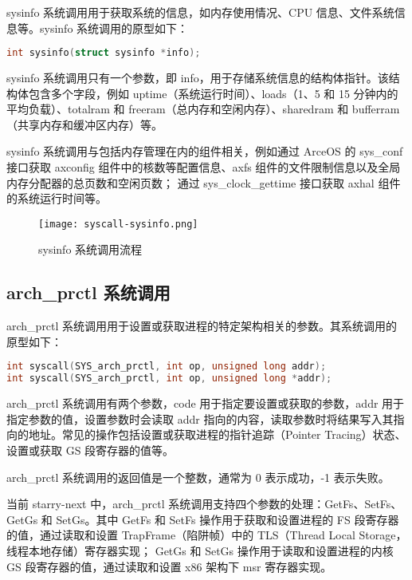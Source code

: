 sysinfo 系统调用用于获取系统的信息，如内存使用情况、CPU 信息、文件系统信息等。sysinfo 系统调用的原型如下：
\begin{lstlisting}[language=c, caption=sysinfo 系统调用函数原型]
int sysinfo(struct sysinfo *info);
\end{lstlisting}
sysinfo 系统调用只有一个参数，即 info，用于存储系统信息的结构体指针。该结构体包含多个字段，例如 uptime（系统运行时间）、loads（1、5 和 15 分钟内的平均负载）、totalram 和 freeram（总内存和空闲内存）、sharedram 和 bufferram（共享内存和缓冲区内存）等。


sysinfo 系统调用与包括内存管理在内的组件相关，例如通过 ArceOS 的 sys\_conf 接口获取 axconfig 组件中的核数等配置信息、axfs 组件的文件限制信息以及全局内存分配器的总页数和空闲页数；
通过 sys\_clock\_gettime 接口获取 axhal 组件的系统运行时间等。

\begin{figure}[H]
    \centering
    \texttt{[image: syscall-sysinfo.png]}
    \caption{sysinfo 系统调用流程}
    \label{fig:sysinfo-call}
\end{figure}

\subsection{arch\_prctl 系统调用}

arch\_prctl 系统调用用于设置或获取进程的特定架构相关的参数。其系统调用的原型如下：
\begin{lstlisting}[language=c, caption=arch\_prctl 系统调用函数原型]
int syscall(SYS_arch_prctl, int op, unsigned long addr);
int syscall(SYS_arch_prctl, int op, unsigned long *addr);
\end{lstlisting}

arch\_prctl 系统调用有两个参数，code 用于指定要设置或获取的参数，addr 用于指定参数的值，设置参数时会读取 addr 指向的内容，读取参数时将结果写入其指向的地址。常见的操作包括设置或获取进程的指针追踪（Pointer Tracing）状态、设置或获取 GS 段寄存器的值等。

arch\_prctl 系统调用的返回值是一个整数，通常为 0 表示成功，-1 表示失败。

当前 starry-next 中，arch\_prctl 系统调用支持四个参数的处理：GetFs、SetFs、GetGs 和 SetGs。其中 GetFs 和 SetFs 操作用于获取和设置进程的 FS 段寄存器的值，通过读取和设置 TrapFrame（陷阱帧）中的 TLS（Thread Local Storage，线程本地存储）寄存器实现；
GetGs 和 SetGs 操作用于读取和设置进程的内核 GS 段寄存器的值，通过读取和设置 x86 架构下 msr 寄存器实现。

